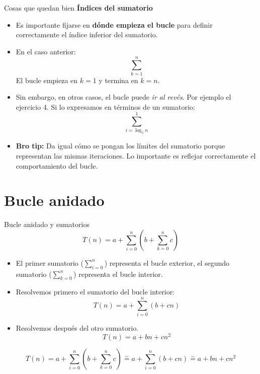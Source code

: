 \documentclass[aspectratio=169]{beamer}
\begin{document}
\begin{frame}{Cosas que quedan bien}
\textbf{Índices del sumatorio}

\begin{itemize}
    \item Es importante fijarse en \textbf{dónde empieza el bucle} para definir correctamente el índice inferior del sumatorio.
    \item En el caso anterior:
    \[
    \sum_{k=1}^n
    \]
    El bucle empieza en \(k = 1\) y termina en \(k = n\).

    \item Sin embargo, en otros casos, el bucle puede \textit{ir al revés}. Por ejemplo el ejercicio 4. Si lo expresamos en términos de un sumatorio:
    \[
    \sum_{i=\log_5 n}^1
    \]

    \item \textbf{Bro tip:} Da igual cómo se pongan los límites del sumatorio porque representan las mismas iteraciones. Lo importante es reflejar correctamente el comportamiento del bucle.
\end{itemize}

\end{frame}

\section{Bucle anidado}

\begin{frame}{Bucle anidado y sumatorios}
\[
T(n) = a + \sum_{i=0}^n \left( b + \sum_{k=0}^n c \right)
\]

\begin{itemize}
    \item El primer sumatorio (\(\sum_{i=0}^n\)) representa el bucle exterior, el segundo sumatorio (\(\sum_{k=0}^n\)) representa el bucle interior.
    \item Resolvemos primero el sumatorio del bucle interior:
    \[
        T(n) = a + \sum_{i=0}^n \left( b + cn \right)
    \]
    \item Resolvemos después del otro sumatorio.
    \[
        T(n) = a + bn + cn^2
    \]
   \end{itemize}

   \[
T(n) = a + \sum_{i=0}^n \left( b + \sum_{k=0}^n c \right) \overset{\sim}{=} a + \sum_{i=0}^n \left( b + cn \right) \overset{\sim}{=} a + bn + cn^2
\]
\end{frame}
\end{document}
